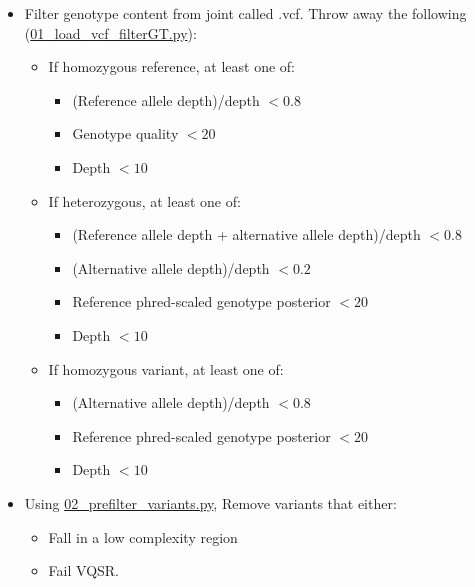 \documentclass[12pt]{article}
\begin{document}
\graphicspath{{../../../QC_plots/sample_plots/}{../../../QC_plots/variant_plots/}}
\maketitle
\begin{itemize}
	\item Filter genotype content from joint called .vcf. Throw away the following (\href{https://github.com/astheeggeggs/BipEx/blob/master/scripts_Dalio/QC_Dalio/01_load_vcf_filterGT.py}{01\_load\_vcf\_filterGT.py}):
	\begin{itemize}
		\item If homozygous reference, at least one of:
		\begin{itemize}
			\item (Reference allele depth)/depth $< 0.8$
			\item Genotype quality $< 20$
			\item Depth $< 10$
		\end{itemize}
		\item If heterozygous, at least one of:
		\begin{itemize}
			\item (Reference allele depth + alternative allele depth)/depth $< 0.8$
			\item (Alternative allele depth)/depth $< 0.2$
			\item Reference phred-scaled genotype posterior $< 20$
			\item Depth $< 10$
		\end{itemize}
		\item If homozygous variant, at least one of:
		\begin{itemize}
			\item (Alternative allele depth)/depth $< 0.8$
			\item Reference phred-scaled genotype posterior $< 20$
			\item Depth $< 10$
		\end{itemize}
    \end{itemize}
    \item Using \href{https://github.com/astheeggeggs/BipEx/blob/master/scripts_Dalio/QC_Dalio/02_prefilter_variants.py}{02\_prefilter\_variants.py}, Remove variants that either:
    \begin{itemize}
    	\item Fall in a low complexity region
    	\item Fail VQSR.
    \end{itemize}

\end{itemize}
\end{document}

